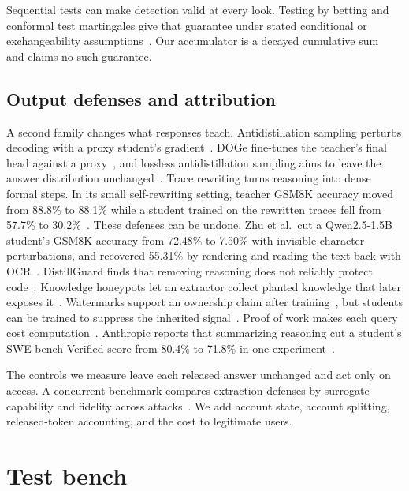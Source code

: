 \documentclass[journal]{IEEEtran}
\begin{document}
Sequential tests can make detection valid at every look. Testing by betting and conformal test martingales give that guarantee under stated conditional or exchangeability assumptions~\cite{shekhar2023betting,vovk2021retrain,ramdas2023gametheoretic}. Our accumulator is a decayed cumulative sum~\cite{page1954cusum} and claims no such guarantee.

\subsection{Output defenses and attribution}
A second family changes what responses teach. Antidistillation sampling perturbs decoding with a proxy student's gradient~\cite{savani2025antidistillation}. DOGe fine-tunes the teacher's final head against a proxy~\cite{li2025doge}, and lossless antidistillation sampling aims to leave the answer distribution unchanged~\cite{diao2026lossless}. Trace rewriting turns reasoning into dense formal steps. In its small self-rewriting setting, teacher GSM8K accuracy moved from 88.8\% to 88.1\% while a student trained on the rewritten traces fell from 57.7\% to 30.2\%~\cite{ma2026tracerewriting}. These defenses can be undone. Zhu et al.\ cut a Qwen2.5-1.5B student's GSM8K accuracy from 72.48\% to 7.50\% with invisible-character perturbations, and recovered 55.31\% by rendering and reading the text back with OCR~\cite{zhu2026learnability}. DistillGuard finds that removing reasoning does not reliably protect code~\cite{jiang2026distillguard}. Knowledge honeypots let an extractor collect planted knowledge that later exposes it~\cite{dai2026knowledgetrap}. Watermarks support an ownership claim after training~\cite{szyller2021dawn,jia2021entangled,chang2026basins}, but students can be trained to suppress the inherited signal~\cite{pan2025watermarks}. Proof of work makes each query cost computation~\cite{dwork1992pricing,dziedzic2022pow}. Anthropic reports that summarizing reasoning cut a student's SWE-bench Verified score from 80.4\% to 71.8\% in one experiment~\cite{anthropic2026defenses}.

The controls we measure leave each released answer unchanged and act only on access. A concurrent benchmark compares extraction defenses by surrogate capability and fidelity across attacks~\cite{liu2026lifecycle}. We add account state, account splitting, released-token accounting, and the cost to legitimate users.

\section{Test bench}
\label{sec:bench}
\end{document}
